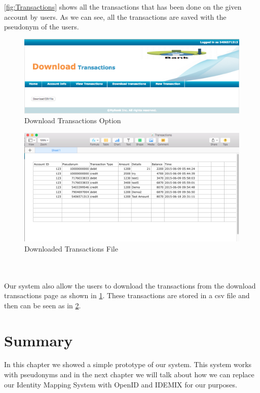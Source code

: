 \\
\\\ref{fig:Transactions} shows all the transactions that has been done on the given account by users. As we can see, all the transactions are saved with the pseudonym of the users.
\begin{figure}[h]
	\centering
	\includegraphics[width=\textwidth]{figures/Download}
	\caption{Download Transactions Option}
	\label{fig:Download}
\end{figure}
\begin{figure}[h]
	\centering
	\includegraphics[width=\textwidth]{figures/File}
	\caption{Downloaded Transactions File}
	\label{fig:File}
\end{figure}	
\\
\\Our system also allow the users to download the transactions from the download transactions page as shown in \ref{fig:Download}. These transactions are stored in a csv file and then can be seen as in \ref{fig:File}.
\section{Summary}
In this chapter we showed a simple prototype of our system. This system works with pseudonyms and in the next chapter we will talk about how we can replace our Identity Mapping System with OpenID and IDEMIX for our purposes.